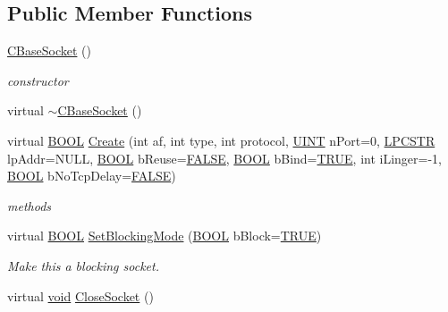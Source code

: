 \subsection*{\-Public \-Member \-Functions}
\begin{DoxyCompactItemize}
\item 
\hyperlink{class_c_base_socket_addf3bf444356a73e1b22b267ffcc3cae}{\-C\-Base\-Socket} ()
\begin{DoxyCompactList}\small\item\em constructor \end{DoxyCompactList}\item 
virtual \hyperlink{class_c_base_socket_affd9b0d8c2917fdc30ff421217ef3c0f}{$\sim$\-C\-Base\-Socket} ()
\item 
virtual \hyperlink{_cpclient_8h_a3be13892ae7076009afcf121347dd319}{\-B\-O\-O\-L} \hyperlink{class_c_base_socket_a5878eecb66f93fe57956656abf048f7d}{\-Create} (int af, int type, int protocol, \hyperlink{_x_plat_8h_a45c20c14d3d8790a22153d08ab2eb2ff}{\-U\-I\-N\-T} n\-Port=0, \hyperlink{_x_plat_8h_a2b72c6037793f6c6381a09c83f27569b}{\-L\-P\-C\-S\-T\-R} lp\-Addr=\-N\-U\-L\-L, \hyperlink{_cpclient_8h_a3be13892ae7076009afcf121347dd319}{\-B\-O\-O\-L} b\-Reuse=\hyperlink{_x_plat_8h_aa93f0eb578d23995850d61f7d61c55c1}{\-F\-A\-L\-S\-E}, \hyperlink{_cpclient_8h_a3be13892ae7076009afcf121347dd319}{\-B\-O\-O\-L} b\-Bind=\hyperlink{_x_plat_8h_aa8cecfc5c5c054d2875c03e77b7be15d}{\-T\-R\-U\-E}, int i\-Linger=-\/1, \hyperlink{_cpclient_8h_a3be13892ae7076009afcf121347dd319}{\-B\-O\-O\-L} b\-No\-Tcp\-Delay=\hyperlink{_x_plat_8h_aa93f0eb578d23995850d61f7d61c55c1}{\-F\-A\-L\-S\-E})
\begin{DoxyCompactList}\small\item\em methods \end{DoxyCompactList}\item 
virtual \hyperlink{_cpclient_8h_a3be13892ae7076009afcf121347dd319}{\-B\-O\-O\-L} \hyperlink{class_c_base_socket_a65ed29350c1d78a6691404738c07b2c2}{\-Set\-Blocking\-Mode} (\hyperlink{_cpclient_8h_a3be13892ae7076009afcf121347dd319}{\-B\-O\-O\-L} b\-Block=\hyperlink{_x_plat_8h_aa8cecfc5c5c054d2875c03e77b7be15d}{\-T\-R\-U\-E})
\begin{DoxyCompactList}\small\item\em \-Make this a blocking socket. \end{DoxyCompactList}\item 
virtual \hyperlink{_cpclient_8h_a6464f7480a0fd0ee170cba12b2c0497f}{void} \hyperlink{class_c_base_socket_ad1e45ab8be1fda6f91704a7159a0a8e4}{\-Close\-Socket} ()

\end{DoxyCompactItemize}
